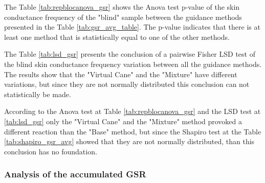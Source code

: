 The Table \ref{tab:repblocanova_gsr} shows the Anova test p-value of the skin conductance frequency of the "blind" sample between the guidance methods presented in the Table \ref{tab:gsr_avg_table}. The p-value indicates that there is at least one method that is statistically equal to one of the other methods.

%

The Table \ref{tab:lsd_gsr} presents the conclusion of a pairwise Fisher LSD test of the blind skin conductance frequency variation between all the guidance methods. The results show that the "Virtual Cane" and the "Mixture" have different variations, but since they are not normally distributed this conclusion can not statistically be made.

%

According to the Anova test at Table \ref{tab:repblocanova_gsr} and the LSD test at \ref{tab:lsd_gsr} only the "Virtual Cane" and the "Mixture" method provoked a different reaction than the "Base" method, but since the Shapiro test at the Table \ref{tab:shapiro_gsr_avg} showed that they are not normally distributed, than this conclusion has no foundation.

\subsubsection{Analysis of the accumulated GSR}



%
%


